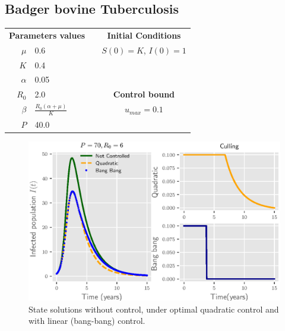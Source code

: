 \subsection*{Badger bovine Tuberculosis}
\begin{table}[H]
  \begin{center}
    \begin{tabular}{@{}rllc@{}}
      \toprule
      \multicolumn{2}{c}{\textbf{Parameters values}}
      &&
      \textbf{Initial Conditions}
      \\
      \cmidrule{1-2}
      \cmidrule{4-4}
      $\mu$
        & \num{0.6}
        &&  
          $S(0) = K$, 
          $I(0) = 1$
      \\
      $K$
        & \num{0.4}
      \\
      $\alpha$
        & \num{0.05}
      \\
      $R_0$
        & \num{2.0}
        && 
          \textbf{Control bound}
      \\
      \cmidrule{4-4}
      $\beta$
        &
         $
          \displaystyle
          \frac{R_0(\alpha + \mu)}{K}
         $
        &&
          $u_{max} = \num{0.1}$
      \\
      $P$
        & \num{40.0}
      \\
      \bottomrule
    \end{tabular}
  \end{center}
\end{table}





\begin{figure}[h]
  \centering
  \includegraphics{Figures/figure_1_culling}
  \caption{State solutions without control, under optimal quadratic control 
  and with linear (bang-bang) control.}
  \label{fig:figure1culling}
\end{figure}

